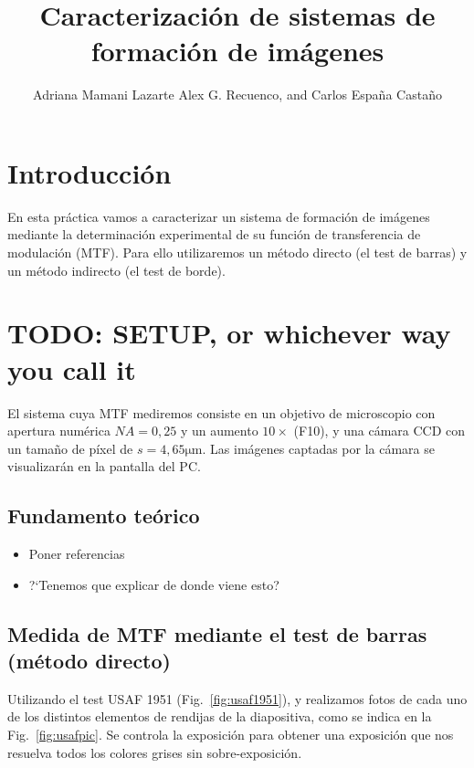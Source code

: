 \documentclass{./packages/optica-article}
\begin{document}
\title{Caracterización de sistemas de formación de imágenes}

\author{Adriana Mamani Lazarte Alex G. Recuenco, and Carlos España Castaño}

\address{Universidad Complutense de Madrid, Madrid, PC 28040, España}

\section{Introducción}
En esta práctica vamos a caracterizar un sistema de formación de imágenes mediante la determinación experimental de su función de transferencia de modulación (MTF). Para ello utilizaremos un método directo (el test de barras) y un método indirecto (el test de borde).


\section{TODO: SETUP, or whichever way you call it}

El sistema cuya MTF mediremos consiste en un objetivo de microscopio con apertura numérica $NA = 0,25$ y un aumento $10\times$ (F10), y una cámara CCD con un tamaño de píxel de $s=4,65 \unit{\micro\meter}$. Las imágenes captadas por la cámara se visualizarán en la pantalla del PC.

\subsection{Fundamento teórico}

\begin{itemize}
	\item Poner referencias
	\item ?`Tenemos que explicar de donde viene esto?
\end{itemize}


\subsection{Medida de MTF mediante el test de barras (método directo)}

Utilizando el test USAF 1951 (Fig.~\ref{fig:usaf1951}), y realizamos fotos de cada uno de los distintos elementos de rendijas de la diapositiva, como se indica en la Fig.~\ref{fig:usafpic}. Se controla la exposición para obtener una exposición que nos resuelva todos los colores grises sin sobre-exposición.
\end{document}
